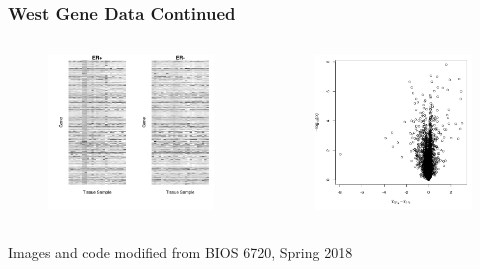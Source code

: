 \documentclass[11pt]{beamer}
\begin{document}
\begin{frame}
\frametitle{West Gene Data Continued}
\begin{columns}

\begin{figure}
\includegraphics[scale = 0.3]{geneImage.png} 
\end{figure}


\begin{figure}
\includegraphics[scale = 0.3]{volcano.png} 
\end{figure}

\end{columns}
\tiny{Images and code modified from BIOS 6720, Spring 2018}
\end{frame}
\end{document}
